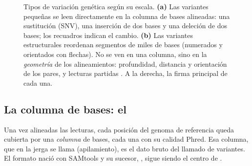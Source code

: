 \begin{figure}[t]
\caption[Tipos de variantes]{Tipos de variación genética según su escala. \textbf{(a)} Las variantes pequeñas se leen directamente en la columna de bases alineadas: una sustitución (SNV), una inserción de dos bases y una deleción de dos bases; los recuadros indican el cambio. \textbf{(b)} Las variantes estructurales reordenan segmentos de miles de bases (numerados y orientados con flechas). No se ven en una columna, sino en la \emph{geometría} de los alineamientos: profundidad, distancia y orientación de los pares, y lecturas partidas \parencite{c09-alkan2011}. A la derecha, la firma principal de cada una.}
\label{fig:09-tipos}
\end{figure}

\subsection{La columna de bases: el }

Una vez alineadas las lecturas, cada posición del genoma de referencia queda cubierta por una \emph{columna} de bases, cada una con su calidad Phred. Esa columna, que en la jerga se llama  (apilamiento), es el dato bruto del llamado de variantes. El formato  nació con SAMtools y su sucesor, , sigue siendo el centro de  \parencite{c09-danecek2021}.

